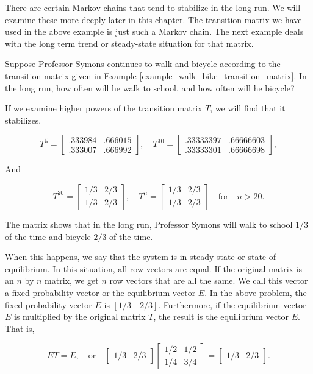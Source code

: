 There are certain Markov chains that tend to stabilize in the long run. We will examine these more deeply later in this chapter. The transition matrix we have used in the above example is just such a Markov chain.  The next example deals with the long term trend or steady-state situation for that matrix.

\begin{example}\label{example_walk_bike_transition_matrix_infinity}
    Suppose Professor Symons continues to walk and bicycle according to the transition matrix given in Example \ref{example_walk_bike_transition_matrix}. In the long run, how often will he walk to school, and how often will he bicycle?
\end{example}

\begin{solution}
    If we examine higher powers of the transition matrix \( T \), we will find that it stabilizes.

    \[ T^5 = \begin{bmatrix}
            .333984 & .666015 \\
            .333007 & .666992
        \end{bmatrix}, \quad
        T^{10} = \begin{bmatrix}
            .33333397 & .66666603 \\
            .33333301 & .66666698
        \end{bmatrix}, \]

    And

    \[ T^{20} = \begin{bmatrix}
            1/3 & 2/3 \\
            1/3 & 2/3
        \end{bmatrix}, \quad
        T^n = \begin{bmatrix}
            1/3 & 2/3 \\
            1/3 & 2/3
        \end{bmatrix} \quad \text{for} \quad n > 20. \]

    The matrix shows that in the long run, Professor Symons will walk to school \( 1/3 \) of the time and bicycle \( 2/3 \) of the time.

    When this happens, we say that the system is in steady-state or state of equilibrium. In this situation, all row vectors are equal. If the original matrix is an \( n \) by \( n \) matrix, we get \( n \) row vectors that are all the same. We call this vector a fixed probability vector or the equilibrium vector \( E \). In the above problem, the fixed probability vector \( E \) is \( [1/3 \quad 2/3] \). Furthermore, if the equilibrium vector \( E \) is multiplied by the original matrix \( T \), the result is the equilibrium vector \( E \). That is,

    \[ ET = E, \quad \text{or} \quad \begin{bmatrix}
            1/3 & 2/3
        \end{bmatrix} \begin{bmatrix}
            1/2 & 1/2 \\
            1/4 & 3/4
        \end{bmatrix} = \begin{bmatrix}
            1/3 & 2/3
        \end{bmatrix}. \]
\end{solution}